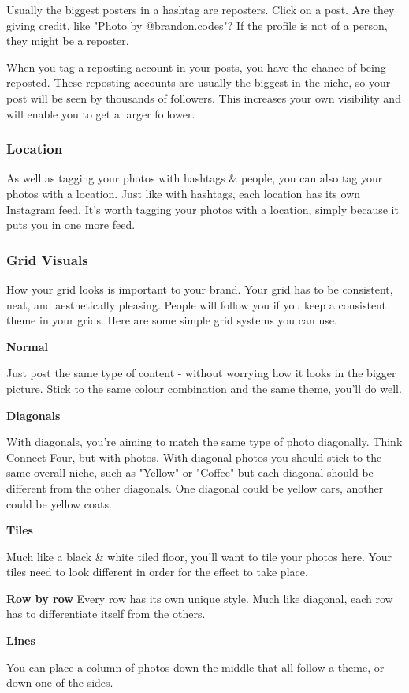 \documentclass{article}
\begin{document}
Usually the biggest posters in a hashtag are reposters. Click on a post.
Are they giving credit, like "Photo by @brandon.codes"? If the profile
is not of a person, they might be a reposter.

When you tag a reposting account in your posts, you have the chance of
being reposted. These reposting accounts are usually the biggest in the
niche, so your post will be seen by thousands of followers. This
increases your own visibility and will enable you to get a larger
follower.
\subsubsection{Location}
As well as tagging your photos with hashtags \& people, you can also tag
your photos with a location. Just like with hashtags, each location has
its own Instagram feed. It's worth tagging your photos with a location,
simply because it puts you in one more feed.
\subsubsection{Grid Visuals}
How your grid looks is important to your brand. Your grid has to be
consistent, neat, and aesthetically pleasing. People will follow you if
you keep a consistent theme in your grids. Here are some simple grid
systems you can use.

\textbf{Normal}

Just post the same type of content - without worrying how it looks in
the bigger picture. Stick to the same colour combination and the same
theme, you'll do well.

\textbf{Diagonals}

With diagonals, you're aiming to match the same type of photo
diagonally. Think Connect Four, but with photos. With diagonal photos
you should stick to the same overall niche, such as "Yellow" or
"Coffee" but each diagonal should be different from the other
diagonals. One diagonal could be yellow cars, another could be yellow
coats.

\textbf{Tiles}

Much like a black \& white tiled floor, you'll want to tile your photos
here. Your tiles need to look different in order for the effect to take
place.

\textbf{Row by row}
Every row has its own unique style. Much like diagonal, each row has to
differentiate itself from the others.

\textbf{Lines}

You can place a column of photos down the middle that all follow a
theme, or down one of the sides.
\end{document}
